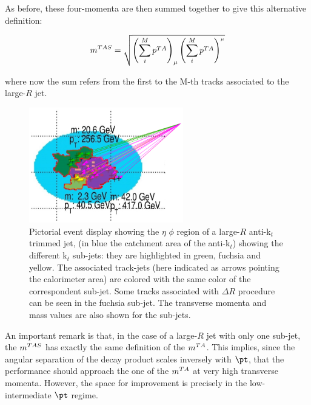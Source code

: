 As before, these four-momenta are then summed together to give this alternative definition:

$$ m^{TAS}=\sqrt{\left(\sum_i^M p^{TA} \right)_\mu \left(\sum_i^M p^{TA} \right)^{_\mu}} $$

where now the sum refers from the first to the M-th tracks associated to the large-$R$ jet.

\begin{figure}[!ht]
  \centering
      \includegraphics[width=0.6\textwidth]{jet_part/mtas/mtas.png}
  \caption[Pictorial event display]{Pictorial event display showing the $\eta$ $\phi$ region of a large-$R$ anti-k$_t$ trimmed jet, (in blue the catchment area of the anti-k$_t$) showing the different k$_t$ sub-jets: they are highlighted in green, fuchsia and yellow. The associated track-jets (here indicated as arrows pointing the calorimeter area) are colored with the same color of the correspondent sub-jet. Some tracks associated with $\Delta R$ procedure can be seen in the fuchsia sub-jet. The transverse momenta and mass values are also shown for the sub-jets.}
  \label{fig:mtas1}
\end{figure}

An important remark is that, in the case of a large-$R$ jet with only one sub-jet, the $m^{TAS}$ has exactly the same definition of the $m^{TA}$. This implies, since the angular separation of the decay product scales inversely with $\pt$, that the performance should approach the one of the $m^{TA}$ at very high transverse momenta. However, the space for improvement is precisely in the low-intermediate $\pt$ regime.
